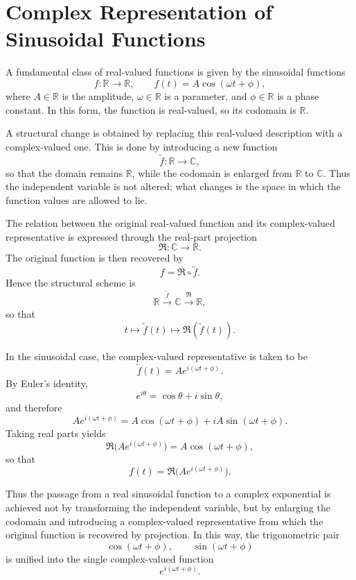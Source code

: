 \documentclass{article}
\begin{document}
	\section*{Complex Representation of Sinusoidal Functions}
	
	A fundamental class of real-valued functions is given by the sinusoidal functions
	\[
	f:\mathbb{R}\to\mathbb{R},
	\qquad
	f(t)=A\cos(\omega t+\phi),
	\]
	where \(A\in\mathbb{R}\) is the amplitude, \(\omega\in\mathbb{R}\) is a parameter, and \(\phi\in\mathbb{R}\) is a phase constant. In this form, the function is real-valued, so its codomain is \(\mathbb{R}\).
	
	A structural change is obtained by replacing this real-valued description with a complex-valued one. This is done by introducing a new function
	\[
	\widetilde f:\mathbb{R}\to\mathbb{C},
	\]
	so that the domain remains \(\mathbb{R}\), while the codomain is enlarged from \(\mathbb{R}\) to \(\mathbb{C}\). Thus the independent variable is not altered; what changes is the space in which the function values are allowed to lie.
	
	The relation between the original real-valued function and its complex-valued representative is expressed through the real-part projection
	\[
	\Re:\mathbb{C}\to\mathbb{R}.
	\]
	The original function is then recovered by
	\[
	f=\Re\circ \widetilde f.
	\]
	Hence the structural scheme is
	\[
	\mathbb{R}\xrightarrow{\;\widetilde f\;}\mathbb{C}\xrightarrow{\;\Re\;}\mathbb{R},
	\]
	so that
	\[
	t\longmapsto \widetilde f(t)\longmapsto \Re(\widetilde f(t)).
	\]
	
	In the sinusoidal case, the complex-valued representative is taken to be
	\[
	\widetilde f(t)=Ae^{i(\omega t+\phi)}.
	\]
	By Euler's identity,
	\[
	e^{i\theta}=\cos\theta+i\sin\theta,
	\]
	and therefore
	\[
	Ae^{i(\omega t+\phi)}
	=
	A\cos(\omega t+\phi)
	+
	iA\sin(\omega t+\phi).
	\]
	Taking real parts yields
	\[
	\Re\!\bigl(Ae^{i(\omega t+\phi)}\bigr)=A\cos(\omega t+\phi),
	\]
	so that
	\[
	f(t)=\Re\!\bigl(Ae^{i(\omega t+\phi)}\bigr).
	\]
	
	Thus the passage from a real sinusoidal function to a complex exponential is achieved not by transforming the independent variable, but by enlarging the codomain and introducing a complex-valued representative from which the original function is recovered by projection. In this way, the trigonometric pair
	\[
	\cos(\omega t+\phi),
	\qquad
	\sin(\omega t+\phi)
	\]
	is unified into the single complex-valued function
	\[
	e^{i(\omega t+\phi)}.
	\]
	
\end{document}
